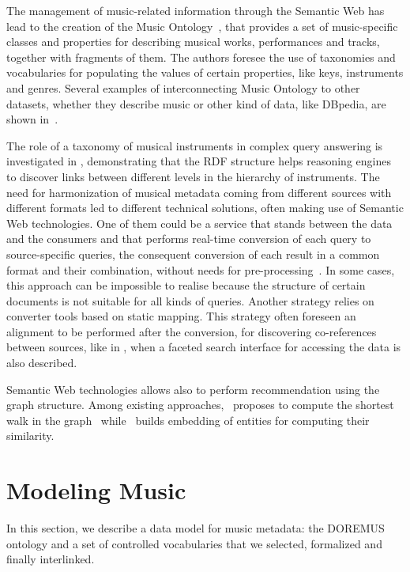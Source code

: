 \documentclass{article}
\begin{document}
The management of music-related information through the Semantic Web has lead to the creation of the Music Ontology~\cite{raimond2007music}, that provides a set of music-specific classes and properties for describing musical works, performances and tracks, together with fragments of them. The authors foresee the use of taxonomies and vocabularies for populating the values of certain properties, like keys, instruments and genres. Several examples of interconnecting Music Ontology to other datasets, whether they describe music or other kind of data, like DBpedia, are shown in~\cite{raimond2008webmusic}.

The role of a taxonomy of musical instruments in complex query answering is investigated in \cite{kolozali2011knowledge}, demonstrating that the RDF structure helps reasoning engines to discover links between different levels in the hierarchy of instruments. The need for harmonization of musical metadata coming from different sources with different formats led to different technical solutions, often making use of Semantic Web technologies. One of them could be a service that stands between the data and the consumers and that performs real-time conversion of each query to source-specific queries, the consequent conversion of each result in a common format and their combination, without needs for pre-processing~\cite{lai2007metadata}. In some cases, this approach can be impossible to realise because the structure of certain documents is not suitable for all kinds of queries. Another strategy relies on converter tools based on static mapping. This strategy often foreseen an alignment to be performed after the conversion, for discovering co-references between sources, like in \cite{bretherton2009integrating}, when a faceted search interface for accessing the data is also described. 

Semantic Web technologies allows also to perform recommendation using the graph structure. Among existing approaches,~\cite{braunhofer2013location} proposes to compute the shortest walk in the graph~\cite{braunhofer2013location} while~\cite{rosati2016rdf} builds embedding of entities for computing their similarity.


\section{Modeling Music}\label{sec:model}
In this section, we describe a data model for music metadata: the DOREMUS ontology and a set of controlled vocabularies that we selected, formalized and finally interlinked.
\end{document}

